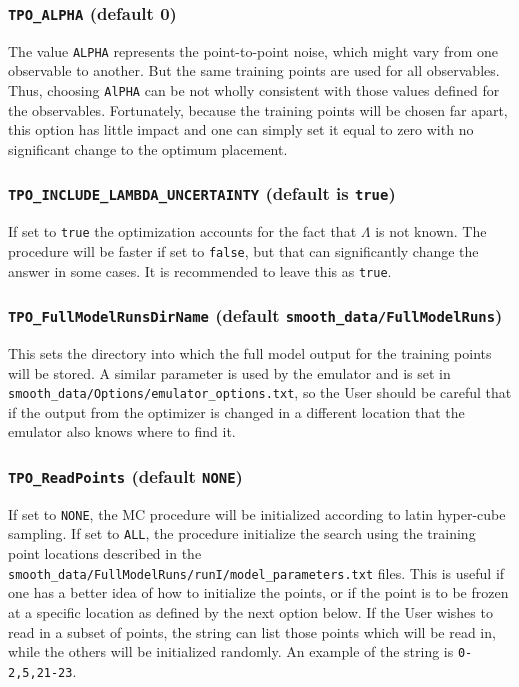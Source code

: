 \documentclass[UserManual.tex]{subfiles}
\begin{document}
\subsubsection{{\tt TPO\_ALPHA} (default 0)}
The value {\tt ALPHA} represents the point-to-point noise, which might vary from one observable to another. But the same training points are used for all observables. Thus, choosing {\tt AlPHA} can be not wholly consistent with those values defined for the observables. Fortunately, because the training points will be chosen far apart, this option has little impact and one can simply set it equal to zero with no significant change to the optimum placement.

\subsubsection{{\tt TPO\_INCLUDE\_LAMBDA\_UNCERTAINTY} (default is {\tt true})}
If set to {\tt true} the optimization accounts for the fact that $\Lambda$ is not known. The procedure will be faster if set to {\tt false}, but that can significantly change the answer in some cases. It is recommended to leave this as {\tt true}.

\subsubsection{{\tt TPO\_FullModelRunsDirName} (default {\tt smooth\_data/FullModelRuns})}
This sets the directory into which the full model output for the training points will be stored. A similar parameter is used by the emulator and is set in {\tt smooth\_data/Options/emulator\_options.txt}, so the User should be careful that if the output from the optimizer is changed in a different location that the emulator also knows where to find it.

\subsubsection{{\tt TPO\_ReadPoints} (default {\tt NONE})}
If set to {\tt NONE}, the MC procedure will be initialized according to latin hyper-cube sampling. If set to {\tt ALL}, the procedure initialize the search using the training point locations described in the {\tt smooth\_data/FullModelRuns/runI/model\_parameters.txt} files. This is useful if one has a better idea of how to initialize the points, or if the point is to be frozen at a specific location as defined by the next option below. If the User wishes to read in a subset of points, the string can list those points which will be read in, while the others will be initialized randomly. An example of the string is {\tt 0-2,5,21-23}.
\end{document}
